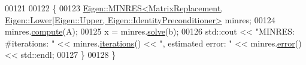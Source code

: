 \begin{DoxyCode}
00121 
00122   \{
00123     
      \hyperlink{group___iterative_linear_solvers___module_class_eigen_1_1_m_i_n_r_e_s}{Eigen::MINRES<MatrixReplacement, Eigen::Lower|Eigen::Upper, Eigen::IdentityPreconditioner>}
       minres;
00124     minres.\hyperlink{group___iterative_linear_solvers___module_a7dfa55c55e82d697bde227696a630914}{compute}(A);
00125     x = minres.\hyperlink{group___sparse_core___module_a4a66e9498b06e3ec4ec36f06b26d4e8f}{solve}(b);
00126     std::cout << \textcolor{stringliteral}{"MINRES:   #iterations: "} << minres.\hyperlink{group___iterative_linear_solvers___module_ae778dd098bd5e6655625b20b1e9f15da}{iterations}() << \textcolor{stringliteral}{", estimated error: "} << 
      minres.\hyperlink{group___iterative_linear_solvers___module_a117c241af3fb1141ad0916a3cf3157ec}{error}() << std::endl;
00127   \}
00128 \}
\end{DoxyCode}

